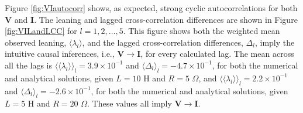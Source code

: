 Figure \ref{fig:VIautocorr} shows, as expected, strong cyclic autocorrelations for both $\mathbf{V}$ and $\mathbf{I}$.  The leaning and lagged cross-correlation differences are shown in Figure \ref{fig:VILandLCC} for $l=1,2,\ldots,5$.  This figure shows both the weighted mean observed leaning, $\langle \lambda_l\rangle$, and the lagged cross-correlation differences, $\Delta_l$, imply the intuitive causal inferences, i.e., $\mathbf{V}\rightarrow\mathbf{I}$, for every calculated lag.  The mean across all the lags is $\langle\langle\lambda_l\rangle\rangle_l=3.9\times 10^{-1}$ and $\langle\Delta_l\rangle_l=-4.7\times 10^{-1}$, for both the numerical and analytical solutions, given $L=10$ H and $R=5$ $\Omega$, and $\langle\langle\lambda_l\rangle\rangle_l=2.2\times 10^{-1}$ and $\langle\Delta_l\rangle_l=-2.6\times 10^{-1}$, for both the numerical and analytical solutions, given $L=5$ H and $R=20$ $\Omega$.  These values all imply $\mathbf{V}\rightarrow\mathbf{I}$.  
